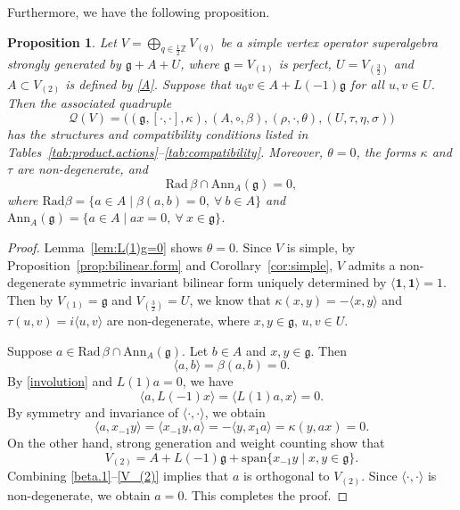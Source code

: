 \documentclass[12pt]{article}
\numberwithin{equation}{section}
\newtheorem{proposition}[theorem]{Proposition}
\theoremstyle{definition}
\theoremstyle{plain}
\newcommand{\bZ}{\ensuremath{\mathbb{Z}}}
\newcommand{\Span}{\mathrm{span }}
\newcommand{\Rad}{\mathrm{Rad }}
\newcommand{\Ann}{\mathrm{Ann }}
\newcommand{\fg}{\mathfrak{g}}
\newcommand{\cQ}{\ensuremath{\mathcal{Q}}}
\newcommand{\bone}{\mathbf{1 }}
\begin{document}
Furthermore, we have the following proposition.
\begin{proposition}\label{prop:simple->}
    Let $V=\bigoplus_{q\in\frac12\bZ}V_{(q)}$ be a simple vertex operator superalgebra strongly generated by $\fg+A+U$, where $\fg=V_{(1)}$ is perfect, $U=V_{(\frac{3}{2})}$ and $A\subset V_{(2)}$ is defined by \eqref{A}. Suppose that $u_0v\in A+L(-1)\fg$ for all $u,v\in U$. Then the associated quadruple
    \begin{equation*}
        \cQ(V)=\Big((\fg,[\cdot,\cdot],\kappa),(A,\circ,\beta),(\rho,\cdot,\theta),(U,\tau,\eta,\sigma)\Big)
    \end{equation*}
    has the structures and compatibility conditions listed in Tables~\ref{tab:product.actions}--\ref{tab:compatibility}. Moreover, $\theta=0$, the forms $\kappa$ and $\tau$ are non-degenerate, and
    \begin{equation}\label{simple.con}
        \Rad\, \beta\cap \Ann_A(\fg)=0,
    \end{equation}
    where $\Rad\beta=\{a\in A\mid \beta(a,b)=0,\ \forall\ b\in A\}$ and $\Ann_A(\fg)
    =\{a\in A\mid ax=0,\ \forall\ x\in\fg\}$.
\end{proposition}
\begin{proof}
     Lemma~\ref{lem:L(1)g=0} shows $\theta=0$. Since $V$ is simple, by Proposition~\ref{prop:bilinear.form} and Corollary~\ref{cor:simple}, $V$ admits a non-degenerate symmetric invariant bilinear form uniquely determined by $\langle\bone,\bone\rangle=1$. Then by $V_{(1)}=\fg$ and $V_{(\frac{3}{2})}=U$, we know that $\kappa(x,y)=-\langle x,y\rangle$ and $\tau(u,v)=i\langle u,v\rangle$ are non-degenerate, where $x,y\in\fg$, $u,v\in U$.

    Suppose $a\in \Rad\,\beta\cap \Ann_A(\fg)$. Let $b\in A$ and $x,y\in\fg$. Then
    \begin{equation}\label{beta.1}
        \langle a,b\rangle=\beta(a,b)=0.
    \end{equation} 
    By \eqref{involution} and $L(1)a=0$, we have
    \begin{equation}\label{beta.2}
        \langle a,L(-1)x\rangle=\langle L(1)a,x\rangle=0.
    \end{equation}
    By symmetry and invariance of $\langle\cdot,\cdot\rangle$, we obtain
    \begin{equation}\label{beta.3}
        \langle a,x_{-1}y\rangle=\langle x_{-1}y,a\rangle=-\langle y,x_1a\rangle=\kappa(y,ax)=0.
    \end{equation}
    On the other hand, strong generation and weight counting show that
    \begin{equation}\label{V_(2)}
        V_{(2)}=A+L(-1)\fg+\Span\{x_{-1}y\mid x,y\in\fg\}.
    \end{equation}
    Combining \eqref{beta.1}--\eqref{V_(2)} implies that $a$ is orthogonal to $V_{(2)}$. Since $\langle\cdot,\cdot\rangle$ is non-degenerate, we obtain $a=0$. This completes the proof.
\end{proof}
\end{document}

